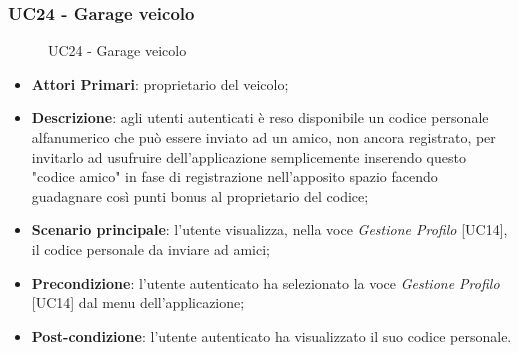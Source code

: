 \subsubsection{UC24 - Garage veicolo}
\begin{figure}[h]
	\centering
	\caption{UC24 - Garage veicolo}
\end{figure}
\begin{itemize}
	\item \textbf{Attori Primari}: proprietario del veicolo;
	\item \textbf{Descrizione}: agli utenti autenticati è reso disponibile un codice personale alfanumerico che può essere inviato ad un amico, non ancora registrato, per invitarlo ad usufruire dell'applicazione semplicemente inserendo questo "codice amico" in fase di registrazione nell'apposito spazio facendo guadagnare così punti bonus al proprietario del codice;
	\item \textbf{Scenario principale}: l'utente visualizza, nella voce \textit{Gestione Profilo} [UC14], il codice personale da inviare ad amici;
	\item \textbf{Precondizione}: l'utente autenticato ha selezionato la voce \textit{Gestione Profilo} [UC14] dal menu dell'applicazione;
	\item \textbf{Post-condizione}: l'utente autenticato ha visualizzato il suo codice personale. 
\end{itemize} 
